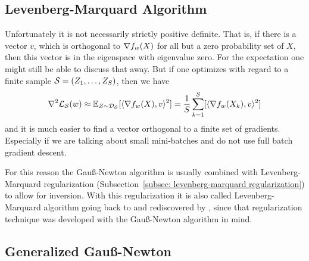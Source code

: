 \subsection{Levenberg-Marquard Algorithm}

Unfortunately it is not necessarily strictly positive definite. That is, if there
is a vector \(v\), which is orthogonal to \(\nabla f_{w}(X)\) for all but a
zero probability set of \(X\), then this vector is in the eigenspace with
eigenvalue zero. For the expectation one might still be able to discuss that
away. But if one optimizes with regard to a finite sample
\(\mathcal{S}=(Z_1,\dots,Z_S)\), then we have
\begin{align*}
	\nabla^2\mathcal{L}_{\mathcal{S}}(w)
	\approx \mathbb{E}_{Z\sim\mathcal{D}_{\mathcal{S}}}[\langle \nabla f_{w}(X), v\rangle^2]
	= \frac1{S}\sum_{k=1}^S [\langle \nabla f_{w}(X_k), v\rangle^2]
\end{align*}
and it is much easier to find a vector orthogonal to a finite set of gradients.
Especially if we are talking about small mini-batches and do not use full batch
gradient descent.

For this reason the Gauß-Newton algorithm is usually combined with
Levenberg-Marquard regularization (Subsection~\ref{subsec: levenberg-marquard
regularization}) to allow for inversion. With this regularization it is also
called Levenberg-Marquard algorithm going back to
\textcite{levenbergMethodSolutionCertain1944} and rediscovered by
\textcite{marquardtAlgorithmLeastSquaresEstimation1963}, since that
regularization technique was developed with the Gauß-Newton algorithm in
mind.

\subsection{Generalized Gauß-Newton}


